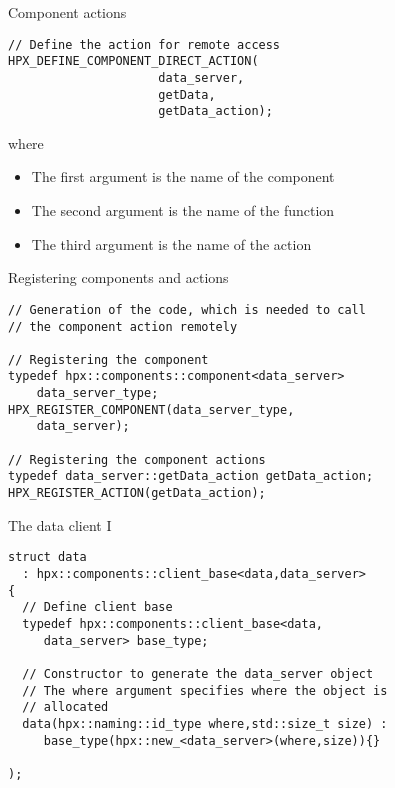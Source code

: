 \documentclass[\classoption]{beamer}
\begin{document}
\begin{frame}[fragile]{Component actions}

\begin{lstlisting}
// Define the action for remote access
HPX_DEFINE_COMPONENT_DIRECT_ACTION(
                     data_server,
                     getData,
                     getData_action);
\end{lstlisting}
where
\begin{itemize}
\item The first argument is the name of the component
\item The second argument is the name of the function
\item The third argument is the name of the action
\end{itemize}
\end{frame}

\begin{frame}[fragile]{Registering components and actions}

\begin{lstlisting}
// Generation of the code, which is needed to call 
// the component action remotely

// Registering the component
typedef hpx::components::component<data_server> 
    data_server_type;
HPX_REGISTER_COMPONENT(data_server_type, 
    data_server);
    
// Registering the component actions
typedef data_server::getData_action getData_action;
HPX_REGISTER_ACTION(getData_action);
\end{lstlisting}

\end{frame}

\begin{frame}[fragile]{The data client I}

\begin{lstlisting}
struct data
  : hpx::components::client_base<data,data_server>
{
  // Define client base
  typedef hpx::components::client_base<data, 
     data_server> base_type;
  
  // Constructor to generate the data_server object
  // The where argument specifies where the object is
  // allocated
  data(hpx::naming::id_type where,std::size_t size) :
     base_type(hpx::new_<data_server>(where,size)){}
        
);
\end{lstlisting}

\end{frame}
\end{document}

